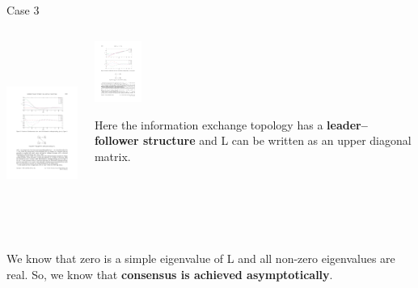 \begin{frame}{Case 3}

\begin{columns}
 \begin{column}{.70\textwidth}
	\begin{center}
		\includegraphics[height=6cm]{images/StatesCase3.pdf}
	\end{center}
	\vskip 0.3cm
 \end{column}
 \begin{column}{.30\textwidth}
 	\vskip 0.3cm
	\begin{center}
		\includegraphics[height=2cm]{images/GraphCase3.pdf}
	\end{center}
	Here the information exchange topology has a 
	{\textcolor{green!40!black}{\fontsize{13}{15}\textbf{leader– follower structure}}}
	and L can be written as an upper diagonal matrix. 
 \end{column}
\end{columns}
We know that zero is a simple eigenvalue of L and all non-zero eigenvalues are real. 
So, we know that {\textcolor{green!40!black}{\fontsize{13}{15}\textbf{consensus is achieved asymptotically}}}.
\vskip 0.3cm
\end{frame}

